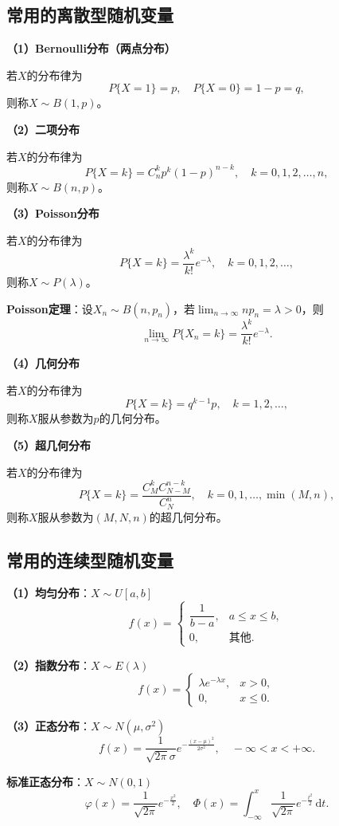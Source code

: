 \documentclass[11pt,a4paper]{report}
\theoremstyle{definition}
\theoremstyle{plain}
\begin{document}
\subsection{常用的离散型随机变量}

\textbf{（1）Bernoulli分布（两点分布）}

若$X$的分布律为
\[
P\{X=1\}=p,\quad P\{X=0\}=1-p=q,
\]
则称$X\sim B(1,p)$。

\textbf{（2）二项分布}

若$X$的分布律为
\[
P\{X=k\}=C_n^k p^k(1-p)^{n-k},\quad k=0,1,2,\ldots,n,
\]
则称$X\sim B(n,p)$。

\textbf{（3）Poisson分布}

若$X$的分布律为
\[
P\{X=k\}=\frac{\lambda^k}{k!}e^{-\lambda},\quad k=0,1,2,\ldots,
\]
则称$X\sim P(\lambda)$。

\textbf{Poisson定理}：设$X_n\sim B(n,p_n)$，若$\lim_{n\to\infty}np_n=\lambda>0$，则
\[
\lim_{n\to\infty}P\{X_n=k\}=\frac{\lambda^k}{k!}e^{-\lambda}.
\]

\textbf{（4）几何分布}

若$X$的分布律为
\[
P\{X=k\}=q^{k-1}p,\quad k=1,2,\ldots,
\]
则称$X$服从参数为$p$的几何分布。

\textbf{（5）超几何分布}

若$X$的分布律为
\[
P\{X=k\}=\frac{C_M^k C_{N-M}^{n-k}}{C_N^n},\quad k=0,1,\ldots,\min(M,n),
\]
则称$X$服从参数为$(M,N,n)$的超几何分布。

\subsection{常用的连续型随机变量}

\textbf{（1）均匀分布}：$X\sim U[a,b]$
\[
f(x)=\begin{cases}
\dfrac{1}{b-a}, & a\leq x\leq b,\\[8pt]
0, & \text{其他}.
\end{cases}
\]

\textbf{（2）指数分布}：$X\sim E(\lambda)$
\[
f(x)=\begin{cases}
\lambda e^{-\lambda x}, & x>0,\\[6pt]
0, & x\leq 0.
\end{cases}
\]

\textbf{（3）正态分布}：$X\sim N(\mu,\sigma^2)$
\[
f(x)=\frac{1}{\sqrt{2\pi}\sigma}e^{-\frac{(x-\mu)^2}{2\sigma^2}},\quad -\infty<x<+\infty.
\]

\textbf{标准正态分布}：$X\sim N(0,1)$
\[
\varphi(x)=\frac{1}{\sqrt{2\pi}}e^{-\frac{x^2}{2}},\quad \Phi(x)=\int_{-\infty}^{x}\frac{1}{\sqrt{2\pi}}e^{-\frac{t^2}{2}}\,\mathrm{d}t.
\]
\end{document}
